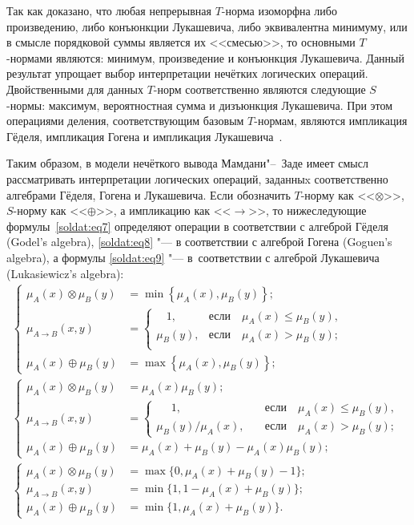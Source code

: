 Так как доказано, что любая непрерывная $T$-норма изоморфна либо произведению,
либо конъюнкции Лукашевича, либо эквивалентна минимуму, или в смысле
порядковой суммы является их <<смесью>>, то основными $T$-нормами являются:
минимум, произведение и конъюнкция Лукашевича. Данный результат упрощает
выбор интерпретации нечётких логических операций. Двойственными для данных
$T$-норм соответственно являются следующие $S$-нормы: максимум, вероятностная
сумма и дизъюнкция Лукашевича. При этом операциями деления, соответствующим
базовым $T$-нормам, являются импликация Гёделя, импликация Гогена и импликация
Лукашевича~\cite{soldat:bib4}.

Таким образом, в модели нечёткого вывода Мамдани"--~Заде имеет смысл
рассматривать интерпретации логических операций, заданныx соответственно
алгебрами Гёделя, Гогена и Лукашевича. Если обозначить $T$-норму как <<$\otimes
$>>, $S$-норму как <<$\oplus $>>, а импликацию как <<$\to $>>, то нижеследующие формулы~\eqref{soldat:eq7}
определяют операции в соответствии с алгеброй Гёделя (Godel's algebra), \eqref{soldat:eq8} "--- в соответствии
с алгеброй Гогена (Goguen's algebra), а формулы \eqref{soldat:eq9} "--- в~соответствии с алгеброй Лукашевича (Lukasiewicz's algebra):
\begin{gather}
\label{soldat:eq7}
\begin{cases}
\mu _A ( x )\otimes \mu _B (y) & = \min \left\{ \mu _A (x),\mu _B (y) \right\}; \\
\mu _{A\to B} ( x,y) &= \begin{cases}
~~~~1, & \text{если} \quad \mu _A ( x )\le \mu _B (y),\\
\mu _B (y), & \text{если} \quad \mu _A ( x )>\mu _B (y); \\
\end{cases} \\
\mu _A ( x )\oplus \mu _B (y) & = \max \left\{ \mu _A ( x
),\mu _B (y)\right\};
\end{cases}\\
\label{soldat:eq8}
\begin{cases}
\mu _A ( x )\otimes \mu _B (y) &= \mu _A ( x )  \mu _B (y); \\
\mu _{A\to B} ( x,y)& =\begin{cases}
~~~~~~1,\quad &\text{если} \quad \mu _A ( x )\le \mu_B (y), \\
{\mu _B (y)}/{\mu _A ( x )},\quad &\text{если} \quad \mu _A ( x )>\mu _B (y);
\end{cases} \\
\mu _A ( x )\oplus \mu _B (y) & = \mu _A ( x )+\mu _B
(y)-\mu _A ( x )  \mu _B (y);
\end{cases}\\
\label{soldat:eq9}
\begin{cases}
\mu _A ( x )\otimes \mu _B (y) & = \max \{ 0, \mu _A ( x )+\mu _B (y)-1 \}; \\[2mm]
\mu _{A\to B} (x,y) &=\min \{ 1, 1-\mu _A ( x )+\mu _B (y) \}; \\[2mm]
\mu _A ( x )\oplus \mu _B (y) &=\min \{ 1, \mu _A ( x )+\mu _B (y) \}.
\end{cases}
\end{gather}

